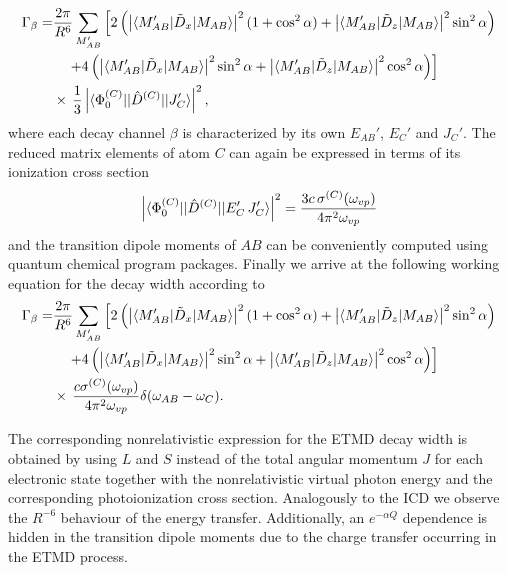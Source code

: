 \begin{align} \label{reltheolifetimeetmd}
 \Gamma_\beta =& \frac{2\pi}{R^6} \sum\limits_{M_{AB}'} \left[ 2\left( \left|
                 \braket{M_{AB}'| \tilde{D}_x |M_{AB}} \right|^2 (1+  \cos^2\alpha)
                 + \left|\braket{M_{AB}'| \tilde{D}_z |M_{AB}}\right|^2 \sin^2\alpha \right) \right. \nonumber \\
           & \quad\left.+ 4 \left( \left|\braket{M_{AB}'| \tilde{D}_x |M_{AB}}
             \right|^2\sin^2\alpha
             + \left|\braket{M_{AB}'| \tilde{D}_z |M_{AB}}\right|^2\cos^2\alpha \right)  \right] \nonumber\\ 
           & \times\, \frac 13  \left| \braket{\Phi_0^{(C)} || \hat{D}^{(C)} ||J'_C} \right|^2
         ,
\end{align}
where each decay channel $\beta$ is characterized by its own $E_{AB}'$, $E_C'$
and $J_C'$. The reduced matrix elements of atom $C$ can again be expressed in
terms of its ionization cross section
\begin{equation}\label{mecross}
  \left| \braket{\Phi_0^{(C)} || \hat{D}^{(C)} || E'_{C}\, J'_{C}} \right|^2
   = \frac{3c\,\sigma^{(C)}(\omega_{vp})}{4\pi^2\omega_{vp}} 
\end{equation}
and the transition dipole moments of $AB$ can be conveniently computed
using quantum chemical program packages.
Finally we arrive at the following working equation for the decay
width according to
\begin{align} \label{reltheolifetimeetmd_exp}
 \Gamma_\beta =& \frac{2\pi}{R^6} \sum\limits_{M_{AB}'} \left[ 2\left( \left| \braket{M_{AB}'| \tilde{D}_x |M_{AB}} \right|^2 (1+ \cos^2\alpha) + \left|\braket{M_{AB}'| \tilde{D}_z |M_{AB}}\right|^2 \sin^2\alpha \right) \right. \nonumber \\
           & \quad\left.+ 4 \left( \left|\braket{M_{AB}'| \tilde{D}_x |M_{AB}}\right|^2\sin^2\alpha + \left|\braket{M_{AB}'| \tilde{D}_z |M_{AB}}\right|^2\cos^2\alpha \right)  \right] \nonumber \\ 
           & \times\, \frac{c\sigma^{(C)}(\omega_{vp})}{4\pi^2 \omega_{vp}}
           \delta (\omega_{AB}-\omega_C) .
\end{align}

The corresponding nonrelativistic expression for the ETMD decay width is
obtained by using $L$ and $S$ instead of the total angular momentum $J$ for
each electronic state together with the nonrelativistic virtual photon
energy and the corresponding photoionization cross section. Analogously to
the ICD we observe the $R^{-6}$ behaviour of the energy transfer.
Additionally, an $e^{-\alpha Q}$ dependence is hidden in the transition
dipole moments due to the charge transfer occurring in the ETMD process.


